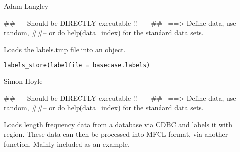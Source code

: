 \documentclass[a4paper]{book}
\begin{document}
%
\begin{Author}\relax

Adam Langley
\end{Author}
%
\begin{Examples}
\begin{ExampleCode}
##---- Should be DIRECTLY executable !! ----
##-- ==>  Define data, use random,
##--	or do  help(data=index)  for the standard data sets.

\end{ExampleCode}
\end{Examples}
%
\begin{Description}\relax

Loads the labels.tmp file into an object. 
\end{Description}
%
\begin{Usage}
\begin{verbatim}
labels_store(labelfile = basecase.labels)
\end{verbatim}
\end{Usage}
%
\begin{Arguments}
\begin{ldescription}
\item[\code{labelfile}] 


\end{ldescription}
\end{Arguments}
%
\begin{Author}\relax

Simon Hoyle
\end{Author}
%
\begin{Examples}
\begin{ExampleCode}
##---- Should be DIRECTLY executable !! ----
##-- ==>  Define data, use random,
##--	or do  help(data=index)  for the standard data sets.

\end{ExampleCode}
\end{Examples}
%
\begin{Description}\relax

Loads length frequency data from a database via ODBC and labels it with region. These data can then be processed into MFCL format, via another function.  
Mainly included as an example. 
\end{Description}
\end{document}
